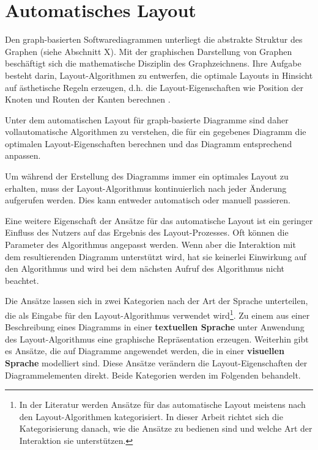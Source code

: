 
\section{Automatisches Layout}
\label{sec:automatic-layout}

Den graph-basierten Softwarediagrammen unterliegt die abstrakte Struktur des Graphen (siehe Abschnitt X). Mit der graphischen Darstellung von Graphen beschäftigt sich die mathematische Disziplin des Graphzeichnens. Ihre Aufgabe besteht darin, Layout-Algorithmen zu entwerfen, die optimale Layouts in Hinsicht auf ästhetische Regeln erzeugen, d.h. die Layout-Eigenschaften wie Position der Knoten und Routen der Kanten berechnen \cite{Eichelberger05Aesthetics, Arvo02Techniques, Siebenhaller03Automatisches, Maier12A-Pattern-based}.

Unter dem automatischen Layout für graph-basierte Diagramme sind daher vollautomatische Algorithmen zu verstehen, die für ein gegebenes Diagramm die optimalen Layout-Eigenschaften berechnen und das Diagramm entsprechend anpassen.

Um während der Erstellung des Diagramms immer ein optimales Layout zu erhalten, muss der Layout-Algorithmus kontinuierlich nach jeder Änderung aufgerufen werden. Dies kann entweder automatisch oder manuell passieren.

Eine weitere Eigenschaft der Ansätze für das automatische Layout ist ein geringer Einfluss des Nutzers auf das Ergebnis des Layout-Prozesses. Oft können die Parameter des Algorithmus angepasst werden. Wenn aber die Interaktion mit dem resultierenden Diagramm unterstützt wird, hat sie keinerlei Einwirkung auf den Algorithmus und wird bei dem nächsten Aufruf des Algorithmus nicht beachtet.

Die Ansätze lassen sich in zwei Kategorien nach der Art der Sprache unterteilen, die als Eingabe für den Layout-Algorithmus verwendet wird\footnote{In der Literatur werden Ansätze für das automatische Layout meistens nach den Layout-Algorithmen kategorisiert. In dieser Arbeit richtet sich die Kategorisierung danach, wie die Ansätze zu bedienen sind und welche Art der Interaktion sie unterstützen.}. Zu einem aus einer Beschreibung eines Diagramms in einer \textbf{textuellen Sprache} unter Anwendung des Layout-Algorithmus eine graphische Repräsentation erzeugen. Weiterhin gibt es Ansätze, die auf Diagramme angewendet werden, die in einer \textbf{visuellen Sprache} modelliert sind. Diese Ansätze verändern die Layout-Eigenschaften der Diagrammelementen direkt. Beide Kategorien werden im Folgenden behandelt.

